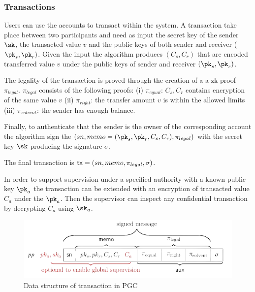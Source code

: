 \subsubsection{Transactions}
Users can use the accounts to transact within the system. A transaction take place between two participants and need as input the secret key of the sender $\sk$, the transacted value $v$ and the public keys of both sender and receiver ($\pk_s, \pk_r)$. Given the input the algorithm produces $(C_s, C_r)$ that are encoded transferred value $v$ under the public keys of sender and receiver $(\pk_s, \pk_r)$.

The legality of the transaction is proved through the creation of a a zk-proof $\pi_{legal}$. $\pi_{legal}$ consists of the following proofs: (i) $\pi_{equal}$: $C_s, C_r$ contains encryption of the same value $v$ (ii) $\pi_{right}$: the transfer amount $v$ is within the allowed limits (iii) $\pi_{solvent}$: the sender has enough balance.

Finally, to authenticate that the sender is the owner of the corresponding account the algorithm sign the $(sn, memo = (\pk_s, \pk_r, C_s, C_r), \pi_{legal})$ with the secret key $\sk$ producing the signature $\sigma$.

The final transaction is $\textup{\textsf{tx}} = (sn, memo, \pi_{legal}, \sigma)$.

In order to support supervision under a specified authority with a known public key $\pk_a$ the transaction can be extended with an encryption of transacted value $C_a$ under the $\pk_a$. Then the supervisor can inspect any confidential transaction by decrypting $C_a$ using $\sk_a$.

\begin{figure}[h]
    \includegraphics[width=\textwidth]{images/pgc/pgc_txn.png}
    \centering
    \caption{Data structure of transaction in PGC}
\end{figure}


